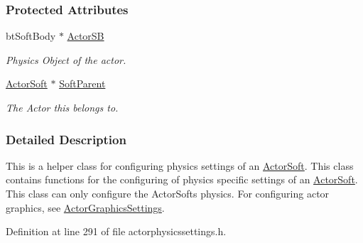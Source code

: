\subsubsection*{Protected Attributes}
\begin{DoxyCompactItemize}
\item 
\hypertarget{classphys_1_1ActorSoftPhysicsSettings_a0258a8c8ab634b6dc26fd86e8edcc25c}{
btSoftBody $\ast$ \hyperlink{classphys_1_1ActorSoftPhysicsSettings_a0258a8c8ab634b6dc26fd86e8edcc25c}{ActorSB}}
\label{classphys_1_1ActorSoftPhysicsSettings_a0258a8c8ab634b6dc26fd86e8edcc25c}

\begin{DoxyCompactList}\small\item\em Physics Object of the actor. \item\end{DoxyCompactList}\item 
\hypertarget{classphys_1_1ActorSoftPhysicsSettings_a94194a1dd89e643b02181010fcad6bc3}{
\hyperlink{classphys_1_1ActorSoft}{ActorSoft} $\ast$ \hyperlink{classphys_1_1ActorSoftPhysicsSettings_a94194a1dd89e643b02181010fcad6bc3}{SoftParent}}
\label{classphys_1_1ActorSoftPhysicsSettings_a94194a1dd89e643b02181010fcad6bc3}

\begin{DoxyCompactList}\small\item\em The Actor this belongs to. \item\end{DoxyCompactList}\end{DoxyCompactItemize}


\subsubsection{Detailed Description}
This is a helper class for configuring physics settings of an \hyperlink{classphys_1_1ActorSoft}{ActorSoft}. This class contains functions for the configuring of physics specific settings of an \hyperlink{classphys_1_1ActorSoft}{ActorSoft}. This class can only configure the ActorSofts physics. For configuring actor graphics, see \hyperlink{classphys_1_1ActorGraphicsSettings}{ActorGraphicsSettings}. 

Definition at line 291 of file actorphysicssettings.h.



